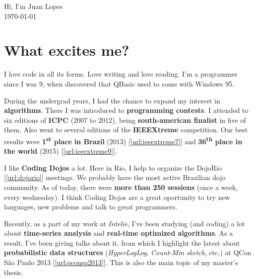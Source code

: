 \documentclass[a4paper,12pt,oneside]{article}
\begin{document}
\author{Juan Lopes}

\begin{center}
	{\huge Hi, I'm Juan Lopes} \\[0.5cm]

	{\large \today}
\end{center}


\renewcommand{\abstractname}{}
\begin{abstract}
\noindent \begin{center}\textit{
Brazilian, lives in Rio de Janeiro. \\
Interested in algorithms, optimization, programming contests and serif typefaces. \\
B.S. in Computer Science; M.S. candidate in Computer Science. \\
Writes high-performance Java code at Intelie for the last 5 years. \\
Wrote beautiful C\# code at Living Consultoria for the 4 years before.
}
\end{center}
\end{abstract}


\section*{What excites me?}

	I love code in all its forms. Love writing and love reading. I'm a programmer
	since I was 9, when discovered that QBasic used to come with Windows 95.

	During the undergrad years, I had the chance to expand my interest in
	\textbf{algorithms}. There I was introduced to \textbf{programming contests}. I
	attended to six editions of \textbf{ICPC} (2007 to 2012), being
	\textbf{south-american finalist} in five of them. Also went to several editions of
	the \textbf{IEEEXtreme} competition. Our best results were \textbf{1\textsuperscript{st} place in Brazil} (2013) [\ref{url:ieeextreme7}]
	and \textbf{36\textsuperscript{th} place in the world} (2015) [\ref{url:ieeextreme9}].

	I like \textbf{Coding Dojos} a lot. Here in Rio, I help to organize the DojoRio
	[\ref{url:dojorio}] meetings. We probably have the most active Brazilian dojo
	community. As of today, there were \textbf{more than 250 sessions} (once a
	week, every wednesday). I think Coding Dojos are a great oportunity to try new
	languages, new problems and talk to great programmers.

	Recently, as a part of my work at \emph{Intelie}, I've been studying (and
	coding) a lot about \textbf{time-series analysis} and \textbf{real-time
	optimized algorithms}. As a result, I've been giving talks about it, from which
	I highlight the latest about \textbf{probabilistic data structures} (\emph{HyperLogLog}, \emph{Count-Min sketch}, etc.) at QCon São
	Paulo 2013 [\ref{url:qconsp2013}]. This is also the main topic of my master's thesis.
\end{document}

